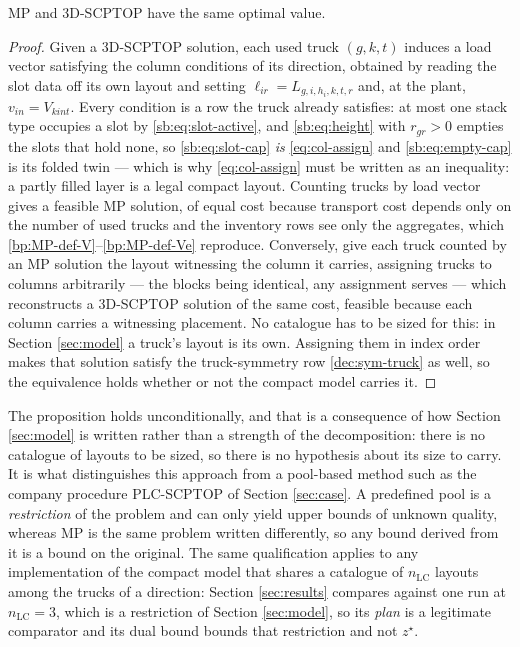 \begin{proposition}[equivalence]
\label{prop:equiv}
MP and 3D-SCPTOP have the same optimal value.
\end{proposition}
\begin{proof}
Given a 3D-SCPTOP solution, each used truck $(g,k,t)$ induces a load
vector satisfying the column conditions of its direction, obtained by
reading the slot data off its own layout and setting
$\ell_{ir}=L_{g,i,h_{i},k,t,r}$ and, at the plant, $v_{in}=V_{kint}$.
Every condition is a row the truck already satisfies: at most one stack
type occupies a slot by \eqref{sb:eq:slot-active}, and
\eqref{sb:eq:height} with $r_{gr}>0$ empties the slots that hold none,
so \eqref{sb:eq:slot-cap} \emph{is} \eqref{eq:col-assign} and
\eqref{sb:eq:empty-cap} is its folded twin --- which is why
\eqref{eq:col-assign} must be written as an inequality: a partly filled
layer is a legal compact layout. Counting trucks by load vector
gives a feasible MP solution, of equal cost because transport cost
depends only on the number of used trucks and the inventory rows see
only the aggregates, which \eqref{bp:MP-def-V}--\eqref{bp:MP-def-Ve}
reproduce. Conversely, give each truck counted by an MP solution the
layout witnessing the column it carries, assigning trucks to columns
arbitrarily --- the blocks being identical, any assignment serves ---
which reconstructs a 3D-SCPTOP solution of the same cost, feasible
because each column carries a witnessing placement. No catalogue has to
be sized for this: in Section \ref{sec:model} a truck's layout is its
own. Assigning them in index
order makes that solution satisfy the truck-symmetry row
\eqref{dec:sym-truck} as well, so the equivalence holds whether or not
the compact model carries it.
\end{proof}

The proposition holds unconditionally, and that is a consequence of
how Section \ref{sec:model} is written rather than a strength of the
decomposition: there is no catalogue of layouts to be sized, so there
is no hypothesis about its size to carry. It is what distinguishes this
approach from a pool-based method such as the company procedure
PLC-SCPTOP of Section \ref{sec:case}. A predefined pool is a
\emph{restriction} of the problem and can only yield upper bounds of
unknown quality, whereas MP is the same problem written differently, so
any bound derived from it is a bound on the original. The same
qualification applies to any implementation of the compact model that
shares a catalogue of $n_{\mathrm{LC}}$ layouts among the trucks of a
direction: Section \ref{sec:results} compares against one run at
$n_{\mathrm{LC}}=3$, which is a restriction of Section
\ref{sec:model}, so its \emph{plan} is a
legitimate comparator and its dual bound bounds that restriction and
not $z^{\star}$.

